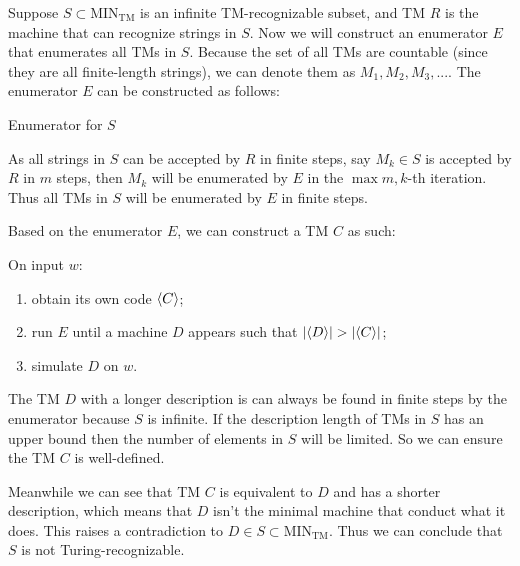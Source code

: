 \documentclass{homework}
\begin{document}
\begin{solution}
Suppose $S\subset \mathrm{MIN}_{\text{TM}}$ is an infinite TM-recognizable subset, and TM $R$ is the machine that can recognize strings in $S$. Now we will construct an enumerator $E$ that enumerates all TMs in $S$. Because the set of all TMs are countable (since they are all finite-length strings), we can denote them as $M_1,M_2,M_3,...$. The enumerator $E$ can be constructed as follows:

\begin{algorithm*}[H]
  \caption{Enumerator for $S$}
\end{algorithm*}

As all strings in $S$ can be accepted by $R$ in finite steps, say $M_k\in S$ is accepted by $R$ in $m$ steps, then $M_k$ will be enumerated by $E$ in the $\max{m,k}$-th iteration. Thus all TMs in $S$ will be enumerated by $E$ in finite steps.

Based on the enumerator $E$, we can construct a TM $C$ as such:

On input $w$:
\begin{enumerate}
  \item obtain its own code $\langle C \rangle$;
  \item run $E$ until a machine $D$ appears such that $|\langle D \rangle| > |\langle C \rangle|$;
  \item simulate $D$ on $w$.
\end{enumerate}

The TM $D$ with a longer description is can always be found in finite steps by the enumerator because $S$ is infinite. If the description length of TMs in $S$ has an upper bound then the number of elements in $S$ will be limited. So we can ensure the TM $C$ is well-defined.

Meanwhile we can see that TM $C$ is equivalent to $D$ and has a shorter description, which means that $D$ isn't the minimal machine that conduct what it does. This raises a contradiction to $D\in S\subset \mathrm{MIN}_{\text{TM}}$. Thus we can conclude that $S$ is not Turing-recognizable.


\end{solution}

\end{document}
